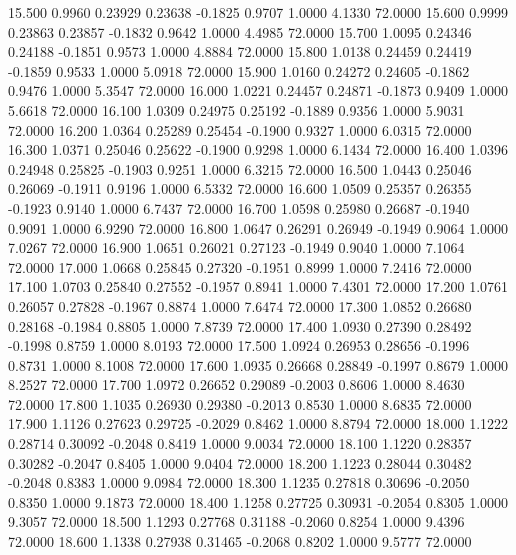   15.500   0.9960   0.23929   0.23638  -0.1825   0.9707   1.0000   4.1330  72.0000
  15.600   0.9999   0.23863   0.23857  -0.1832   0.9642   1.0000   4.4985  72.0000
  15.700   1.0095   0.24346   0.24188  -0.1851   0.9573   1.0000   4.8884  72.0000
  15.800   1.0138   0.24459   0.24419  -0.1859   0.9533   1.0000   5.0918  72.0000
  15.900   1.0160   0.24272   0.24605  -0.1862   0.9476   1.0000   5.3547  72.0000
  16.000   1.0221   0.24457   0.24871  -0.1873   0.9409   1.0000   5.6618  72.0000
  16.100   1.0309   0.24975   0.25192  -0.1889   0.9356   1.0000   5.9031  72.0000
  16.200   1.0364   0.25289   0.25454  -0.1900   0.9327   1.0000   6.0315  72.0000
  16.300   1.0371   0.25046   0.25622  -0.1900   0.9298   1.0000   6.1434  72.0000
  16.400   1.0396   0.24948   0.25825  -0.1903   0.9251   1.0000   6.3215  72.0000
  16.500   1.0443   0.25046   0.26069  -0.1911   0.9196   1.0000   6.5332  72.0000
  16.600   1.0509   0.25357   0.26355  -0.1923   0.9140   1.0000   6.7437  72.0000
  16.700   1.0598   0.25980   0.26687  -0.1940   0.9091   1.0000   6.9290  72.0000
  16.800   1.0647   0.26291   0.26949  -0.1949   0.9064   1.0000   7.0267  72.0000
  16.900   1.0651   0.26021   0.27123  -0.1949   0.9040   1.0000   7.1064  72.0000
  17.000   1.0668   0.25845   0.27320  -0.1951   0.8999   1.0000   7.2416  72.0000
  17.100   1.0703   0.25840   0.27552  -0.1957   0.8941   1.0000   7.4301  72.0000
  17.200   1.0761   0.26057   0.27828  -0.1967   0.8874   1.0000   7.6474  72.0000
  17.300   1.0852   0.26680   0.28168  -0.1984   0.8805   1.0000   7.8739  72.0000
  17.400   1.0930   0.27390   0.28492  -0.1998   0.8759   1.0000   8.0193  72.0000
  17.500   1.0924   0.26953   0.28656  -0.1996   0.8731   1.0000   8.1008  72.0000
  17.600   1.0935   0.26668   0.28849  -0.1997   0.8679   1.0000   8.2527  72.0000
  17.700   1.0972   0.26652   0.29089  -0.2003   0.8606   1.0000   8.4630  72.0000
  17.800   1.1035   0.26930   0.29380  -0.2013   0.8530   1.0000   8.6835  72.0000
  17.900   1.1126   0.27623   0.29725  -0.2029   0.8462   1.0000   8.8794  72.0000
  18.000   1.1222   0.28714   0.30092  -0.2048   0.8419   1.0000   9.0034  72.0000
  18.100   1.1220   0.28357   0.30282  -0.2047   0.8405   1.0000   9.0404  72.0000
  18.200   1.1223   0.28044   0.30482  -0.2048   0.8383   1.0000   9.0984  72.0000
  18.300   1.1235   0.27818   0.30696  -0.2050   0.8350   1.0000   9.1873  72.0000
  18.400   1.1258   0.27725   0.30931  -0.2054   0.8305   1.0000   9.3057  72.0000
  18.500   1.1293   0.27768   0.31188  -0.2060   0.8254   1.0000   9.4396  72.0000
  18.600   1.1338   0.27938   0.31465  -0.2068   0.8202   1.0000   9.5777  72.0000
